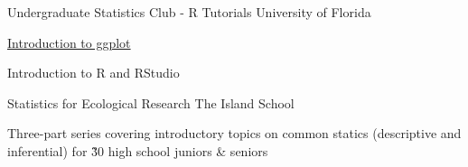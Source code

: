 \begin{cventries}
\cventry
    {Undergraduate Statistics Club - R Tutorials} %
    {} %
    {} %
    {University of Florida} %
    {
      \begin{cvitems} %
        \item {\href{https://docs.google.com/presentation/d/1wLYdzfTozv4Ua9NcGBkFsLCsZIIpxa_4aHGOmYWh-p0/edit?usp=sharing}{Introduction to ggplot}}
        \item {Introduction to R and RStudio}
      \end{cvitems}
    }

\cventry
    {Statistics for Ecological Research} %
    {} %
    {} %
    {The Island School} %
    {
      \begin{cvitems} %
        \item {Three-part series covering introductory topics on common statics (descriptive and inferential) for \~30 high school juniors \& seniors}
      \end{cvitems}
    }


\end{cventries}


